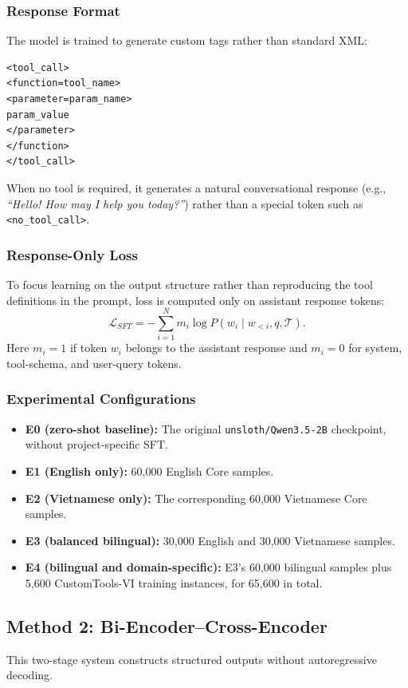 \documentclass[10pt,twocolumn,a4paper]{article}
\begin{document}
\subsubsection{Response Format}
The model is trained to generate custom tags rather than standard XML:
\begin{verbatim}
<tool_call>
<function=tool_name>
<parameter=param_name>
param_value
</parameter>
</function>
</tool_call>
\end{verbatim}
When no tool is required, it generates a natural conversational response (e.g., \textit{``Hello! How may I help you today?''}) rather than a special token such as \texttt{<no\_tool\_call>}.

\subsubsection{Response-Only Loss}
To focus learning on the output structure rather than reproducing the tool definitions in the prompt, loss is computed only on assistant response tokens:
\[
\mathcal{L}_{SFT}=-\sum_{i=1}^{N}m_i\log P(w_i\mid w_{<i},q,\mathcal{T}).
\]
Here $m_i=1$ if token $w_i$ belongs to the assistant response and $m_i=0$ for system, tool-schema, and user-query tokens.

\subsubsection{Experimental Configurations}
\begin{itemize}
    \item \textbf{E0 (zero-shot baseline):} The original \texttt{unsloth/Qwen3.5-2B} checkpoint, without project-specific SFT.
    \item \textbf{E1 (English only):} 60,000 English Core samples.
    \item \textbf{E2 (Vietnamese only):} The corresponding 60,000 Vietnamese Core samples.
    \item \textbf{E3 (balanced bilingual):} 30,000 English and 30,000 Vietnamese samples.
    \item \textbf{E4 (bilingual and domain-specific):} E3's 60,000 bilingual samples plus 5,600 CustomTools-VI training instances, for 65,600 in total.
\end{itemize}

\subsection{Method 2: Bi-Encoder--Cross-Encoder}
This two-stage system constructs structured outputs without autoregressive decoding.
\end{document}
